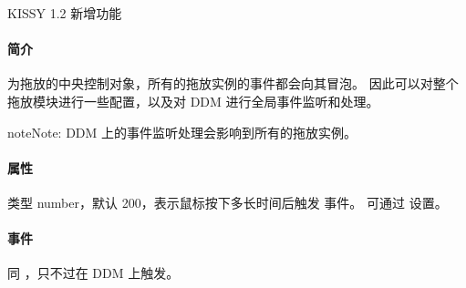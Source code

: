 \documentclass[letterpaper,10pt,english]{sphinxmanual}
\begin{document}


KISSY 1.2 {\hyperref[api/seed/loader/index:module-Loader]{}} 新增功能




\paragraph{简介}
\label{api/component/dd/ddm:id2}

\begin{fulllineitems}
\label{api/component/dd/ddm:DD.DDM}
为拖放的中央控制对象，所有的拖放实例的事件都会向其冒泡。
因此可以对整个拖放模块进行一些配置，以及对 DDM 进行全局事件监听和处理。

\end{fulllineitems}


\begin{notice}{note}{Note:}
DDM 上的事件监听处理会影响到所有的拖放实例。
\end{notice}


\paragraph{属性}
\label{api/component/dd/ddm:id3}

\begin{fulllineitems}
\label{api/component/dd/ddm:DD.DDM.bufferTimer}
类型 number，默认 200，表示鼠标按下多长时间后触发 {\hyperref[api/component/dd/draggable:DD.Draggable.dragstart]{}} 事件。
可通过  设置。

\end{fulllineitems}



\paragraph{事件}
\label{api/component/dd/ddm:id4}

\begin{fulllineitems}
\label{api/component/dd/ddm:DD.DDM.dragstart}
同 {\hyperref[api/component/dd/draggable:DD.Draggable.dragstart]{}} ，只不过在 DDM 上触发。

\end{fulllineitems}
\end{document}
